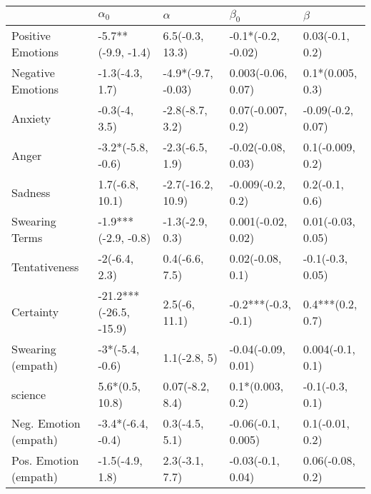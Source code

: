 \begin{tabular}{lllll}
\toprule
{} &              $\alpha_0$ &            $\alpha$ &            $\beta_0$ &            $\beta$ \\
\midrule
Positive Emotions     &      -5.7**(-9.9, -1.4) &     6.5(-0.3, 13.3) &   -0.1*(-0.2, -0.02) &    0.03(-0.1, 0.2) \\
Negative Emotions     &         -1.3(-4.3, 1.7) &  -4.9*(-9.7, -0.03) &   0.003(-0.06, 0.07) &   0.1*(0.005, 0.3) \\
Anxiety               &           -0.3(-4, 3.5) &     -2.8(-8.7, 3.2) &    0.07(-0.007, 0.2) &  -0.09(-0.2, 0.07) \\
Anger                 &       -3.2*(-5.8, -0.6) &     -2.3(-6.5, 1.9) &   -0.02(-0.08, 0.03) &   0.1(-0.009, 0.2) \\
Sadness               &         1.7(-6.8, 10.1) &   -2.7(-16.2, 10.9) &    -0.009(-0.2, 0.2) &     0.2(-0.1, 0.6) \\
Swearing Terms        &     -1.9***(-2.9, -0.8) &     -1.3(-2.9, 0.3) &   0.001(-0.02, 0.02) &  0.01(-0.03, 0.05) \\
Tentativeness         &           -2(-6.4, 2.3) &      0.4(-6.6, 7.5) &     0.02(-0.08, 0.1) &   -0.1(-0.3, 0.05) \\
Certainty             &  -21.2***(-26.5, -15.9) &       2.5(-6, 11.1) &  -0.2***(-0.3, -0.1) &   0.4***(0.2, 0.7) \\
Swearing (empath)     &         -3*(-5.4, -0.6) &        1.1(-2.8, 5) &   -0.04(-0.09, 0.01) &   0.004(-0.1, 0.1) \\
science               &         5.6*(0.5, 10.8) &     0.07(-8.2, 8.4) &     0.1*(0.003, 0.2) &    -0.1(-0.3, 0.1) \\
Neg. Emotion (empath) &       -3.4*(-6.4, -0.4) &      0.3(-4.5, 5.1) &   -0.06(-0.1, 0.005) &    0.1(-0.01, 0.2) \\
Pos. Emotion (empath) &         -1.5(-4.9, 1.8) &      2.3(-3.1, 7.7) &    -0.03(-0.1, 0.04) &   0.06(-0.08, 0.2) \\
\bottomrule
\end{tabular}
